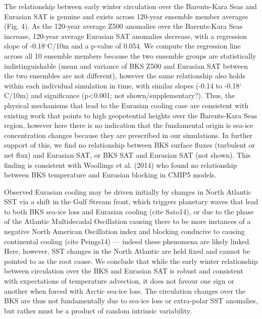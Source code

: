 \documentclass[grl]{AGUTeX}  %
\begin{document}
\begin{article}
The relationship between early winter circulation over the Barents-Kara Seas and Eurasian SAT is genuine and exists across 120-year ensemble member averages (Fig. 4). As the 120-year average Z500 anomalies over the Barents-Kara Seas increase, 120-year average Eurasian SAT anomalies decrease, with a regression slope of -0.18$^\circ$C/10m and a p-value of 0.054. We compute the regression line across all 10 ensemble members because the two ensemble groups are statistically indistinguishable (mean and variance of BKS Z500 and Eurasian SAT between the two ensembles are not different), however the same relationship also holds within each individual simulation in time, with similar slopes (-0.14 to -0.18$^\circ$C/10m) and significance (p<0.001; not shown/supplementary?). Thus, the physical mechanisms that lead to the Eurasian cooling case are consistent with existing work that points to high geopotential heights over the Barents-Kara Seas region, however here there is no indication that the fundamental origin is sea-ice concentration changes because they are prescribed in our simulations. In further support of this, we find no relationship between BKS surface fluxes (turbulent or net flux) and Eurasian SAT, or BKS SAT and Eurasian SAT (not shown). This finding is consistent with Woollings et al. (2014) who found no relationship between BKS temperature and Eurasian blocking in CMIP5 models. %

Observed Eurasian cooling may be driven initially by changes in North Atlantic SST via a shift in the Gulf Stream front, which triggers planetary waves that lead to both BKS sea-ice loss and Eurasian cooling (cite Sato14), or due to the phase of the Atlantic Multidecadal Oscillation causing there to be more instances of a negative North American Oscillation index and blocking conducive to causing continental cooling (cite Peings14) --- indeed these phenomena are likely linked. Here, however, SST changes in the North Atlantic are held fixed and cannot be pointed to as the root cause. We conclude that while the early winter relationship between circulation over the BKS and Eurasian SAT is robust and consistent with expectations of temperature advection, it does not favour one sign or another when forced with Arctic sea-ice loss. The circulation changes over the BKS are thus not fundamentally due to sea-ice loss or extra-polar SST anomalies, but rather must be a product of random intrinsic variability. 


\end{article}
\end{document}
